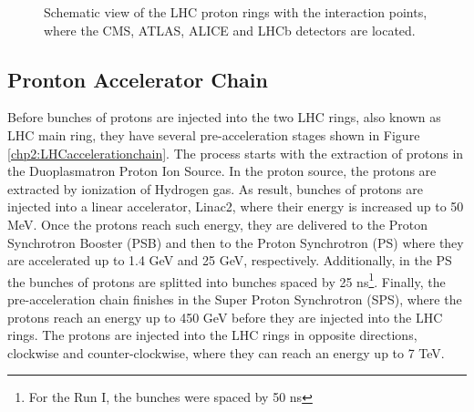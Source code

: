 \begin{figure}[ht]
\begin{center}
\caption{Schematic view of the LHC proton rings with the interaction points, 
where the CMS, ATLAS, ALICE and LHCb detectors are located.}\label{chp2:LHCringsfigure}
\end{center}
\end{figure}

\subsection{Pronton Accelerator Chain}
\label{subsec:ProtonAcceleratorChain}


Before bunches of protons are injected into the two LHC rings, also known as LHC main ring, they have several
pre-acceleration stages  shown in Figure \ref{chp2:LHCaccelerationchain}. The process starts with the extraction of protons 
in the Duoplasmatron Proton Ion Source. In the proton source, the protons are extracted by
ionization of Hydrogen gas. As result, bunches of protons are injected into a linear 
accelerator, Linac2, where their energy is increased up to 50 MeV. Once the protons 
reach such energy, they are delivered to the Proton Synchrotron Booster (PSB) and then to the
Proton Synchrotron (PS) where they are accelerated up to 1.4 GeV and 25 GeV, respectively. Additionally,
in the PS the bunches of protons are splitted into bunches spaced by 
25 ns\footnote{For the Run I, the bunches were spaced by 50 ns}. Finally, 
the pre-acceleration chain finishes in the Super Proton Synchrotron (SPS), where 
the protons reach an energy up to 450 GeV before they are injected into the LHC rings. The 
protons are injected into the LHC rings in opposite directions, clockwise and counter-clockwise, where 
they can reach an energy up to 7 TeV.

